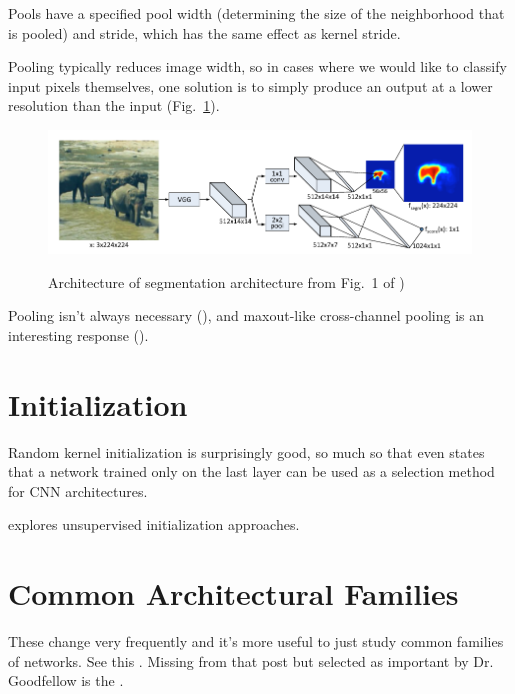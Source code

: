 \documentclass{article}
\begin{document}
Pools have a specified pool width (determining the size of the neighborhood that is pooled) and stride, which has the same effect as kernel stride.

Pooling typically reduces image width, so in cases where we would like to classify input pixels themselves, one solution is to simply produce an output at a lower resolution than the input (Fig.~\ref{fig:pinheiro}).

\begin{figure}[!h]
\centering
{\includegraphics[width=\textwidth]{pinheiro.pdf}}
\caption{Architecture of segmentation architecture from Fig.~1 of )}
\label{fig:pinheiro}
\end{figure}

Pooling isn't always necessary (), and maxout-like cross-channel pooling is an interesting response ().

\section{Initialization}

Random kernel initialization is surprisingly good, so much so that  even states that a network trained only on the last layer can be used as a selection method for CNN architectures.

 explores unsupervised initialization approaches.

\section{Common Architectural Families}

These change very frequently and it's more useful to just study common families of networks. See this . Missing from that post but selected as important by Dr. Goodfellow is the .
\end{document}

